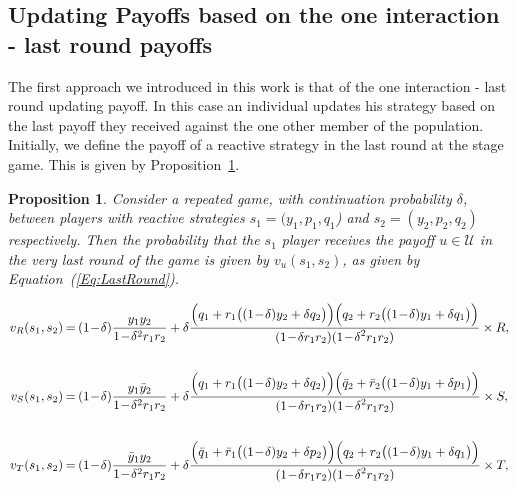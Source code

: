 \documentclass[11pt]{article}
\theoremstyle{plainCl1}
\newtheorem{Prop}{Proposition}
\theoremstyle{plainCl2}
\begin{document}
\subsection{Updating Payoffs based on the one interaction - last round payoffs}

The first approach we introduced in this work is that of the one  interaction -
last round updating payoff. In this case an individual updates his strategy
based on the last payoff they received against the one other member of the
population. Initially, we define the payoff of a reactive strategy in the last
round at the stage game. This is given by
Proposition~\ref{proposition:last_round}.

\begin{Prop}\label{proposition:last_round} Consider a repeated game, with
    continuation probability $\delta$, between players with reactive strategies
    $s_1\!=\!(y_1, p_1, q_1$)  and $s_2\!=\!(y_2,p_2,q_2)$ respectively. Then
    the probability that the $s_1$ player receives the payoff $u\!\in\!
    \mathcal{U}$ in the very last round of the game is given by
    $v_{u}(s_1,s_2)$, as given by Equation~(\ref{Eq:LastRound}).

    \begin{equation} \label{Eq:LastRound}
      \setlength{\arraycolsep}{1pt}
      \begin{array}{rcl}
    
      v_{R}(s_1,s_2) &= &\displaystyle (1\!-\!\delta)\frac{y_1y_2}{1\!-\!\delta^2 r_1 r_2}+\delta \frac{\Big(q_1+r_1\big((1\!-\!\delta)y_2+\delta q_2\big)\Big) \Big(q_2+r_2\big((1\!-\!\delta)y_1+\delta q_1\big)\Big)}
      {\displaystyle(1\!-\!\delta r_1r_2)(1\!-\!\delta^2 r_1 r_2)} \times R,\\[1cm]
    
      v_{S}(s_1,s_2) &= &\displaystyle (1\!-\!\delta)\frac{y_1\bar{y}_2}{1\!-\!\delta^2 r_1 r_2}+\delta \frac{\Big(q_1+r_1\big((1\!-\!\delta)y_2+\delta q_2\big)\Big) \Big(\bar{q}_2+\bar{r}_2\big((1\!-\!\delta)y_1+\delta p_1\big)\Big)}
      {\displaystyle(1\!-\!\delta r_1r_2)(1\!-\!\delta^2 r_1 r_2)} \times S,\\[1cm]
    
      v_{T}(s_1,s_2) &= &\displaystyle (1\!-\!\delta)\frac{\bar{y}_1y_2}{1\!-\!\delta^2 r_1 r_2}+\delta \frac{\Big(\bar{q}_1+\bar{r}_1\big((1\!-\!\delta)y_2+\delta p_2\big)\Big) \Big(q_2+r_2\big((1\!-\!\delta)y_1+\delta q_1\big)\Big)}
      {\displaystyle(1\!-\!\delta r_1r_2)(1\!-\!\delta^2 r_1 r_2)} \times T,\\[1cm]
    

\end{array}
\end{equation}
\end{Prop}
\end{document}
